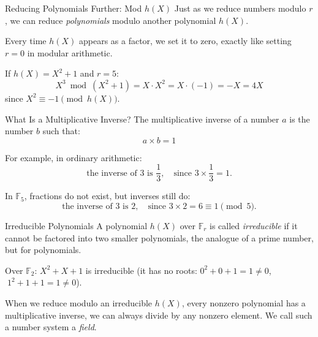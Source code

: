 \documentclass{beamer}
\begin{document}

\begin{frame}{Reducing Polynomials Further: Mod $h(X)$}
Just as we reduce numbers modulo $r$, we can reduce \emph{polynomials}
modulo another polynomial $h(X)$.

Every time $h(X)$ appears as a factor, we set it to zero, exactly
like setting $r = 0$ in modular arithmetic.

\begin{example}
If $h(X) = X^2 + 1$ and $r = 5$:
\[
    X^3 \bmod (X^2+1) = X \cdot X^2 = X \cdot (-1) = -X = 4X
\]
since $X^2 \equiv -1 \pmod{h(X)}$.
\end{example}
\end{frame}

\begin{frame}{What Is a Multiplicative Inverse?}
The multiplicative inverse of a number $a$ is the number $b$ such that:
\[
    a \times b = 1
\]

For example, in ordinary arithmetic:
\[
    \text{the inverse of } 3 \text{ is } \frac{1}{3}, \quad
    \text{since } 3 \times \frac{1}{3} = 1.
\]

In $\mathbb{F}_5$, fractions do not exist, but inverses still do:
\[
    \text{the inverse of } 3 \text{ is } 2, \quad
    \text{since } 3 \times 2 = 6 \equiv 1 \pmod{5}.
\]
\end{frame}


\begin{frame}{Irreducible Polynomials}
A polynomial $h(X)$ over $\mathbb{F}_r$ is called \emph{irreducible} if it
cannot be factored into two smaller polynomials, the analogue of a prime number,
but for polynomials.

\begin{example}
Over $\mathbb{F}_2$: \quad $X^2 + X + 1$ is irreducible
(it has no roots: $0^2+0+1=1\ne 0$, $\;1^2+1+1=1\ne 0$).
\end{example}

When we reduce modulo an irreducible $h(X)$, every nonzero polynomial
has a multiplicative inverse, we can always divide by any nonzero element.
We call such a number system a \emph{field}.
\end{frame}

\end{document}
